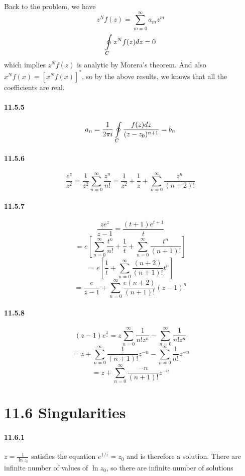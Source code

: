 \documentclass[a4paper]{article}
\begin{document}
Back to the problem, we have
\[
z^N f(z)=\sum_{m=0}^\infty a_mz^m
\]
\[
\oint\displaylimits_C  z^Nf(z)dz=0
\]
which implies $z^Nf(z)$ is analytic by Morera’s theorem. And also $x^Nf(x)=\left[x^Nf(x)\right]^*$, so by the above results, we knows that all the coefficients are real.

\paragraph{11.5.5}
\[
a_n=\frac{1}{2\pi i}\oint\displaylimits_C\frac{f(z)dz}{(z-z_0)^{n+1}}=b_n
\]

\paragraph{11.5.6}
\[
\frac{e^z}{z^2}=\frac{1}{z^2}\sum_{n=0}^\infty\frac{z^n}{n!}=\frac{1}{z^2}+\frac{1}{z}+\sum_{n=0}^\infty\frac{z^n}{(n+2)!}
\]

\paragraph{11.5.7}
\[
\frac{ze^z}{z-1}=\frac{(t+1)e^{t+1}}{t}\]
\[
=e\left[\sum_{n=0}^\infty\frac{t^n}{n!}+\frac{1}{t}+\sum_{n=0}^\infty\frac{t^n}{(n+1)!} \right]
\]
\[
=e\left[\frac{1}{t}+\sum_{n=0}^\infty\frac{(n+2)}{(n+1)!}t^n \right]
\]
\[
=\frac{e}{z-1}+\sum_{n=0}^\infty\frac{e(n+2)}{(n+1)!}(z-1)^n
\]

\paragraph{11.5.8}
\[
(z-1)e^{\frac{1}{z}}=z\sum_{n=0}^\infty\frac{1}{n!z^n}-\sum_{n=0}^\infty\frac{1}{n!z^n}
\]
\[
=z+\sum_{n=0}^\infty\frac{1}{(n+1)!}z^{-n}-\sum_{n=0}^\infty\frac{1}{n!}z^{-n}
\]
\[
=z+\sum_{n=0}^\infty\frac{-n}{(n+1)!}z^{-n}
\]

\section*{11.6 Singularities}

\paragraph{11.6.1}
$z=\frac{1}{\ln z_0}$ satisfies the equation $e^{1/z}=z_0$ and is therefore a solution. There are infinite number of values of $\ln z_0$, so there are infinite number of solutions
\end{document}
